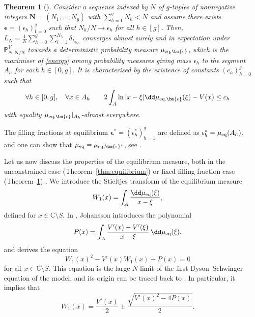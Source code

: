 \documentclass[pdftex]{sigma}
\numberwithin{equation}{section}
\newtheorem{Theorem}{Theorem}[section]
\newcommand{\C}{\mathbb{C}}
\begin{document}
\begin{Theorem}[{\cite[Theorem 1.2]{BGmulti}}]
 \label{mueqfixed} Consider a sequence indexed by $N$ of $g$-tuples of nonnegative
 integers $\bm{N} = (N_{1}, \ldots, N_{g})$ with $\sum_{h=1}^{g}N_{h} < N$ and
 assume there exists
 $\bm{\epsilon} = (\epsilon_{h})_{1 = 0}^{g}$ such that
 $N_{h}/N \to \epsilon_{h}$ for all $h \in [g]$.
 Then, $L_{N} = \frac{1}{N} \sum_{h = 0}^{g} \sum_{i=1}^{N_{h}}\delta_{\lambda_{h, i}}$
 converges almost surely and in expectation under $\mathbb{P}^{V}_{N,\bm{N}/N}$ towards a deterministic probability measure $\mu_{{\rm eq},\bm{\epsilon}}$, which is the maximiser of \eqref{energy} among probability measures giving mass $\epsilon_h$ to the segment $A_h$ for each $h \in [0,g]$. It is characterised by the existence of constants $(c_h)_{h = 0}^{g}$ such that
\[
\forall h \in [0,g], \quad \forall x \in A_h \qquad 2\int_{A}\ln|x - \xi|\dd\mu_{{\rm eq},\bm{\epsilon}}(\xi) - V(x) \leq c_h
\]
with equality $\mu_{{\rm eq},\bm{\epsilon}}|_{A_h}$-almost everywhere.
\end{Theorem}

The filling fractions at equilibrium
$\bm{\epsilon}^{*} = (\epsilon_{h}^{*})_{h=1}^{g}$ are defined as $\epsilon_{h}^{*} = \mu_{{\rm eq}}(A_h)$, and one can show that $\mu_{{\rm eq}} = \mu_{{\rm eq}, \bm{\epsilon}^{*}}$, see \cite[Section~1.4]{BGmulti}.

Let us now discuss the properties of the equilibrium measure, both in the unconstrained case (Theorem~\ref{thm:equilibrium}) or fixed filling fraction case (Theorem~\ref{mueqfixed}) . We introduce the Stieltjes transform of the equilibrium measure
\[
 W_{1}(x) = \int_{A}\frac{\dd \mu_{{\rm eq}}(\xi)}{x - \xi},
\]
defined for $x \in \C \setminus S$. In \cite{Johan}, Johansson introduces the polynomial
\[
 P(x) = \int_{A}\frac{V'(x) - V'(\xi)}{x - \xi}\,\dd \mu_{{\rm eq}}(\xi),
\]
and derives the equation
\begin{equation}\label{eq:variational}
 W_{1}(x)^{2} - V'(x)W_{1}(x) + P(x) = 0
\end{equation}
for all $x \in \C\setminus S$. This equation is the large $N$ limit of the first
Dyson--Schwinger equation of the model, and its origin can be traced back to
\cite{BIPZ,migdal_loop_1983}. In particular, it implies that
\begin{equation*}%
 W_{1}(x) = \frac{V'(x)}{2} \pm \frac{\sqrt{V'(x)^{2} - 4P(x)}}{2}.
\end{equation*}
\end{document}
